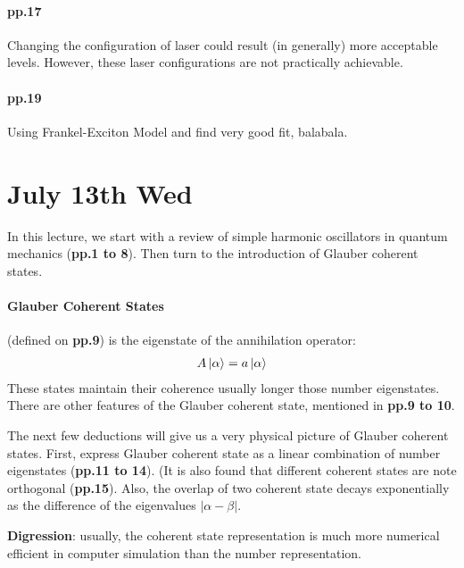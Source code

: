 \documentclass{article}
\numberwithin{equation}{subsection} %
\theoremstyle{definition}
\begin{document}
\paragraph{pp.17}
Changing the configuration of laser could result (in generally) more
acceptable levels. However, these laser configurations are not practically
achievable.

\paragraph{pp.19}
Using Frankel-Exciton Model and find very good fit, balabala.


\section{July 13th Wed}
\label{sec:July_13th}

In this lecture, we start with a review of simple harmonic
oscillators in quantum mechanics (\textbf{pp.1 to 8}).
Then turn to the introduction of Glauber coherent states.

\paragraph{Glauber Coherent States} (defined on \textbf{pp.9})
is the eigenstate of the annihilation 
operator:
    \begin{align}
        A \ket{\alpha} = a \ket{\alpha}
    \end{align}
These states maintain their coherence usually longer those number
eigenstates. There are other features of the Glauber coherent state,
mentioned in \textbf{pp.9 to 10}.

The next few deductions will give us a very physical picture of Glauber
coherent states. First, express Glauber coherent state as a linear
combination of number eigenstates (\textbf{pp.11 to 14}). 
(It is also found that different coherent states are note 
orthogonal (\textbf{pp.15}). Also, the overlap of
two coherent state decays exponentially as the difference 
of the eigenvalues $|\alpha-\beta|$.

\textbf{Digression}: usually, the coherent state representation is
much more numerical efficient in computer simulation
than the number representation.
\end{document}

